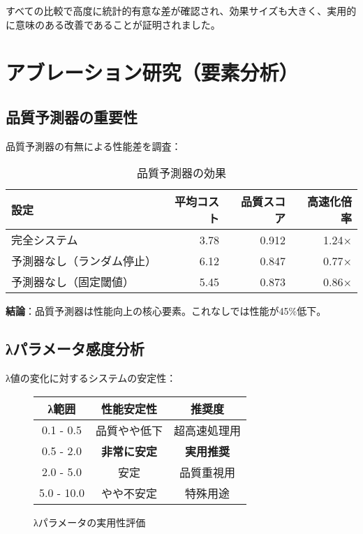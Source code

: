 \documentclass[a4paper,12pt]{jsarticle}
\begin{document}
すべての比較で高度に統計的有意な差が確認され、効果サイズも大きく、実用的に意味のある改善であることが証明されました。

\section{アブレーション研究（要素分析）}

\subsection{品質予測器の重要性}

品質予測器の有無による性能差を調査：

\begin{table}[H]
\centering
\caption{品質予測器の効果}
\begin{tabular}{|l|r|r|r|}
\hline
\textbf{設定} & \textbf{平均コスト} & \textbf{品質スコア} & \textbf{高速化倍率} \\
\hline
完全システム & 3.78 & 0.912 & 1.24× \\
予測器なし（ランダム停止） & 6.12 & 0.847 & 0.77× \\
予測器なし（固定閾値） & 5.45 & 0.873 & 0.86× \\
\hline
\end{tabular}
\end{table}

\textbf{結論}：品質予測器は性能向上の核心要素。これなしでは性能が45\%低下。

\subsection{λパラメータ感度分析}

λ値の変化に対するシステムの安定性：

\begin{figure}[H]
\centering
\begin{tabular}{|c|c|c|}
\hline
\textbf{λ範囲} & \textbf{性能安定性} & \textbf{推奨度} \\
\hline
0.1 - 0.5 & 品質やや低下 & 超高速処理用 \\
0.5 - 2.0 & \textbf{非常に安定} & \textbf{実用推奨} \\
2.0 - 5.0 & 安定 & 品質重視用 \\
5.0 - 10.0 & やや不安定 & 特殊用途 \\
\hline
\end{tabular}
\caption{λパラメータの実用性評価}
\end{figure}
\end{document}
